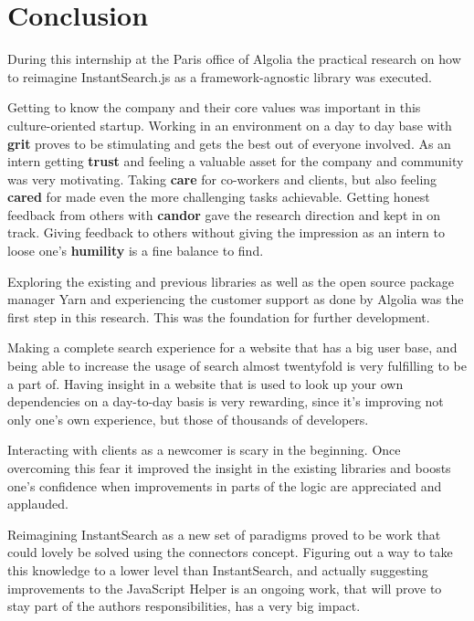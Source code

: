 
\chapter{Conclusion} %
\label{chp:conclusion}

During this internship at the Paris office of Algolia the practical research on how to reimagine InstantSearch.js as a framework-agnostic library was executed.

Getting to know the company and their core values was important in this culture-oriented startup. Working in an environment on a day to day base with \textbf{grit} proves to be stimulating and gets the best out of everyone involved. As an intern getting \textbf{trust} and feeling a valuable asset for the company and community was very motivating. Taking \textbf{care} for co-workers and clients, but also feeling \textbf{cared} for made even the more challenging tasks achievable. Getting honest feedback from others with \textbf{candor} gave the research direction and kept in on track. Giving feedback to others without giving the impression as an intern to loose one's \textbf{humility} is a fine balance to find.

Exploring the existing and previous libraries as well as the open source package manager Yarn and experiencing the customer support as done by Algolia was the first step in this research. This was the foundation for further development.

Making a complete search experience for a website that has a big user base, and being able to increase the usage of search almost twentyfold is very fulfilling to be a part of. Having insight in a website that is used to look up your own dependencies on a day-to-day basis is very rewarding, since it's improving not only one's own experience, but those of thousands of developers.

Interacting with clients as a newcomer is scary in the beginning. Once overcoming this fear it improved the insight in the existing libraries and boosts one's confidence when improvements in parts of the logic are appreciated and applauded.

Reimagining InstantSearch as a new set of paradigms proved to be work that could lovely be solved using the connectors concept. Figuring out a way to take this knowledge to a lower level than InstantSearch, and actually suggesting improvements to the JavaScript Helper is an ongoing work, that will prove to stay part of the authors responsibilities, has a very big impact.

